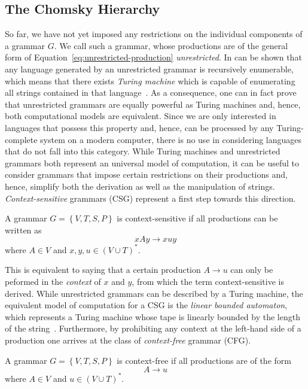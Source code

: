 \subsection{The Chomsky Hierarchy}
So far, we have not yet imposed any restrictions on the individual components of a grammar $G$.
We call such a grammar, whose productions are of the general form of Equation~\eqref{eq:unrestricted-production} \emph{unrestricted}.
In can be shown that any language generated by an unrestricted grammar is recursively enumerable, which means that there exists \emph{Turing machine} which is capable of enumerating all strings contained in that language~\cite{linz2006introduction}.
As a consequence, one can in fact prove that unrestricted grammars are equally powerful as Turing machines and, hence, both computational models are equivalent.
Since we are only interested in languages that possess this property and, hence, can be processed by any Turing-complete system on a modern computer, there is no use in considering languages that do not fall into this category.
While Turing machines and unrestricted grammars both represent an universal model of computation, it can be useful to consider grammars that impose certain restrictions on their productions and, hence, simplify both the derivation as well as the manipulation of strings.
\emph{Context-sensitive} grammars (CSG) represent a first step towards this direction.
\begin{definition}
A grammar $G = \left\{V, T, S, P\right\}$ is context-sensitive if all productions can be written as
\begin{equation*}
	xAy \to xuy
\end{equation*}
where $A \in V$ and $x, y, u \in \left(V \cup T\right)^*$.
\label{def:context-sensitive-grammar}
\end{definition}
This is equivalent to saying that a certain production $A \to u$ can only be peformed in the \emph{context} of $x$ and $y$, from which the term context-sensitive is derived.
While unrestricted grammars can be described by a Turing machine, the equivalent model of computation for a CSG is the \emph{linear bounded automaton}, which represents a Turing machine whose tape is linearly bounded by the length of the string~\cite{linz2006introduction}.
Furthermore, by prohibiting any context at the left-hand side of a production one arrives at the class of \emph{context-free} grammar (CFG).
\begin{definition}
	A grammar $G = \left\{V, T, S, P\right\}$ is context-free if all productions are of the form
	\begin{equation*}
		A \to u 
	\end{equation*}
	where $A \in V$ and $u \in \left(V \cup T\right)^*$.
\end{definition}
